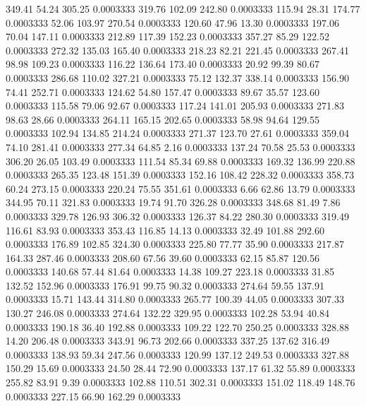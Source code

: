  349.41   54.24  305.25   0.0003333
 319.76  102.09  242.80   0.0003333
 115.94   28.31  174.77   0.0003333
  52.06  103.97  270.54   0.0003333
 120.60   47.96   13.30   0.0003333
 197.06   70.04  147.11   0.0003333
 212.89  117.39  152.23   0.0003333
 357.27   85.29  122.52   0.0003333
 272.32  135.03  165.40   0.0003333
 218.23   82.21  221.45   0.0003333
 267.41   98.98  109.23   0.0003333
 116.22  136.64  173.40   0.0003333
  20.92   99.39   80.67   0.0003333
 286.68  110.02  327.21   0.0003333
  75.12  132.37  338.14   0.0003333
 156.90   74.41  252.71   0.0003333
 124.62   54.80  157.47   0.0003333
  89.67   35.57  123.60   0.0003333
 115.58   79.06   92.67   0.0003333
 117.24  141.01  205.93   0.0003333
 271.83   98.63   28.66   0.0003333
 264.11  165.15  202.65   0.0003333
  58.98   94.64  129.55   0.0003333
 102.94  134.85  214.24   0.0003333
 271.37  123.70   27.61   0.0003333
 359.04   74.10  281.41   0.0003333
 277.34   64.85    2.16   0.0003333
 137.24   70.58   25.53   0.0003333
 306.20   26.05  103.49   0.0003333
 111.54   85.34   69.88   0.0003333
 169.32  136.99  220.88   0.0003333
 265.35  123.48  151.39   0.0003333
 152.16  108.42  228.32   0.0003333
 358.73   60.24  273.15   0.0003333
 220.24   75.55  351.61   0.0003333
   6.66   62.86   13.79   0.0003333
 344.95   70.11  321.83   0.0003333
  19.74   91.70  326.28   0.0003333
 348.68   81.49    7.86   0.0003333
 329.78  126.93  306.32   0.0003333
 126.37   84.22  280.30   0.0003333
 319.49  116.61   83.93   0.0003333
 353.43  116.85   14.13   0.0003333
  32.49  101.88  292.60   0.0003333
 176.89  102.85  324.30   0.0003333
 225.80   77.77   35.90   0.0003333
 217.87  164.33  287.46   0.0003333
 208.60   67.56   39.60   0.0003333
  62.15   85.87  120.56   0.0003333
 140.68   57.44   81.64   0.0003333
  14.38  109.27  223.18   0.0003333
  31.85  132.52  152.96   0.0003333
 176.91   99.75   90.32   0.0003333
 274.64   59.55  137.91   0.0003333
  15.71  143.44  314.80   0.0003333
 265.77  100.39   44.05   0.0003333
 307.33  130.27  246.08   0.0003333
 274.64  132.22  329.95   0.0003333
 102.28   53.94   40.84   0.0003333
 190.18   36.40  192.88   0.0003333
 109.22  122.70  250.25   0.0003333
 328.88   14.20  206.48   0.0003333
 343.91   96.73  202.66   0.0003333
 337.25  137.62  316.49   0.0003333
 138.93   59.34  247.56   0.0003333
 120.99  137.12  249.53   0.0003333
 327.88  150.29   15.69   0.0003333
  24.50   28.44   72.90   0.0003333
 137.17   61.32   55.89   0.0003333
 255.82   83.91    9.39   0.0003333
 102.88  110.51  302.31   0.0003333
 151.02  118.49  148.76   0.0003333
 227.15   66.90  162.29   0.0003333
